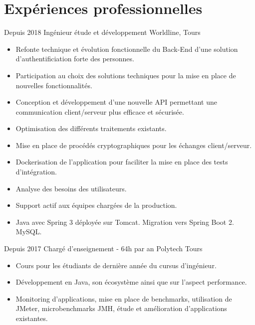 \documentclass[]{friggeri-cv}
\begin{document}
\section{Expériences professionnelles}
\begin{entrylist}
      \vspace{7pt}    
  \entry
    {Depuis 2018}
    {Ingénieur étude et développement}
    {Worldline, Tours}
    {
    \vspace{-0.8\baselineskip}
	\begin{itemize}[leftmargin=*]
		\item Refonte technique et évolution fonctionnelle du Back-End d'une solution d'authentificiation forte des personnes.
		\item Participation au choix des solutions techniques pour la mise en place de nouvelles fonctionnalités.
		\item Conception et développement d'une nouvelle API permettant une communication client/serveur plus efficace et sécurisée.
		\item Optimisation des différents traitements existants.
		\item Mise en place de procédés cryptographiques pour les échanges client/serveur.
		\item Dockerisation de l'application pour faciliter la mise en place des tests d'intégration.
		\item Analyse des besoins des utilisateurs.
		\item Support actif aux équipes chargées de la production.
		\item Java avec Spring 3 déployée sur Tomcat. Migration vers Spring Boot 2. MySQL.
	\end{itemize}
	}
      \vspace{7pt}    
  \entry
    {Depuis 2017}
    {Chargé d'enseignement - 64h par an}
    {Polytech Tours}
    {
    \vspace{-0.8\baselineskip}
	\begin{itemize}[leftmargin=*]
		\item Cours pour les étudiants de dernière année du cursus d'ingénieur.
		\item Développement en Java, son écosystème ainsi que sur l'aspect performance.
		\item Monitoring d'applications, mise en place de benchmarks, utilisation de JMeter, microbenchmarks JMH, étude et amélioration d'applications existantes.
	\end{itemize}
	}
      \vspace{7pt}    

\end{entrylist}
\end{document}
